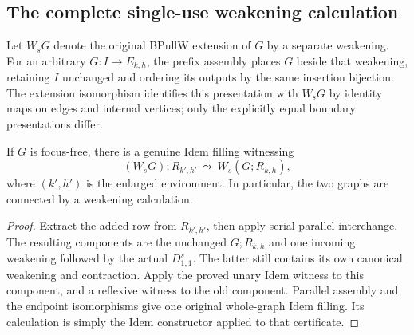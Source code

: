 \subsection{The complete single-use weakening calculation}
Let $W_sG$ denote the original BPullW extension of $G$ by a separate weakening.
For an arbitrary $G:I\to E_{k,h}$, the prefix assembly places $G$ beside
that weakening, retaining $I$ unchanged and ordering its outputs by the
same insertion bijection. The extension isomorphism identifies this
presentation with $W_sG$ by identity maps on edges and internal vertices;
only the explicitly equal boundary presentations differ.

\begin{theorem}
If $G$ is focus-free, there is a genuine Idem filling witnessing
\[
       (W_sG);R_{k',h'}\ \leadsto\ W_s(G;R_{k,h}),
\]
where $(k',h')$ is the enlarged environment. In particular, the two graphs
are connected by a weakening calculation.
\end{theorem}
\begin{proof}
Extract the added row from $R_{k',h'}$, then apply serial-parallel
interchange. The resulting components are the unchanged $G;R_{k,h}$ and
one incoming weakening followed by the actual $D_{1,1}^{s}$. The latter
still contains its own canonical weakening and contraction. Apply the
proved unary Idem witness to this component, and a reflexive witness to
the old component. Parallel assembly and the endpoint isomorphisms give
one original whole-graph Idem filling. Its calculation is simply the Idem
constructor applied to that certificate.
\end{proof}

